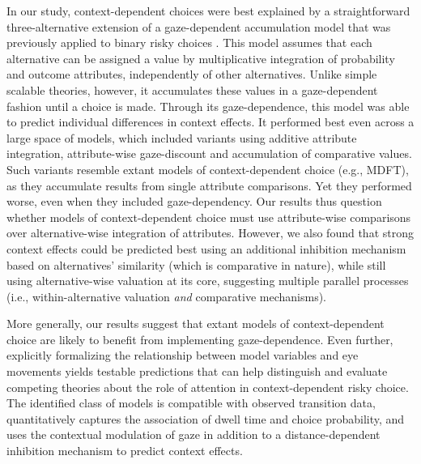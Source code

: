 \documentclass[11pt, a4paper]{article}
\begin{document}
In our study, context-dependent choices were best explained by a straightforward three-alternative extension of a gaze-dependent accumulation model that was previously applied to binary risky choices \autocite{glickman2019FormationPreferenceRisky}. This model assumes that each alternative can be assigned a value by multiplicative integration of probability and outcome attributes, independently of other alternatives. Unlike simple scalable theories, however, it accumulates these values in a gaze-dependent fashion until a choice is made. Through its gaze-dependence, this model was able to predict individual differences in context effects. It performed best even across a large space of models, which included variants using additive attribute integration, attribute-wise gaze-discount and accumulation of comparative values. Such variants resemble extant models of context-dependent choice (e.g., MDFT\autocite{roe2001MultialternativeDecisionField}), as they accumulate results from single attribute comparisons. Yet they performed worse, even when they included gaze-dependency. Our results thus question whether models of context-dependent choice must use attribute-wise comparisons over alternative-wise integration of attributes. However, we also found that strong context effects could be predicted best using an additional inhibition mechanism based on alternatives’ similarity (which is comparative in nature), while still using alternative-wise valuation at its core, suggesting multiple parallel processes (i.e., within-alternative valuation \emph{and} comparative mechanisms). 

More generally, our results suggest that extant models of context-dependent choice are likely to benefit from implementing gaze-dependence. Even further, explicitly formalizing the relationship between model variables and eye movements yields testable predictions that can help distinguish and evaluate competing theories about the role of attention in context-dependent risky choice. The identified class of models is compatible with observed transition data, quantitatively captures the association of dwell time and choice probability, and uses the contextual modulation of gaze in addition to a distance-dependent inhibition mechanism to predict context effects.

\clearpage
\end{document}
